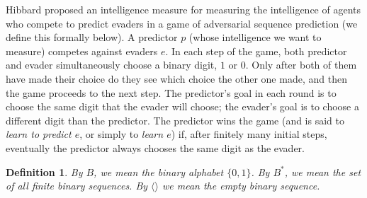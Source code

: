 \documentclass{article}
\newtheorem{definition}[theorem]{Definition}
\begin{document}
Hibbard proposed an intelligence measure for measuring the intelligence
of agents who compete to predict evaders in a game of
adversarial sequence prediction (we define this
formally below). A predictor $p$ (whose intelligence we want to measure)
competes against evaders $e$. In each step of the game,
both predictor and evader simultaneously choose a binary digit, $1$ or $0$.
Only after both of them have made their choice do they see which choice the other
one made, and then the game proceeds to the next step. The predictor's goal in
each round is to choose the same digit that the evader will choose;
the evader's goal is to choose a different digit than the predictor. The predictor
wins the game (and is said to \emph{learn to predict $e$}, or simply to
\emph{learn $e$}) if, after finitely many
initial steps, eventually the predictor always chooses the same digit as the
evader.

\begin{definition}
By $B$, we mean the binary alphabet $\{0,1\}$. By $B^*$, we mean the set of all
finite binary sequences. By $\langle\rangle$ we mean the empty binary sequence.
\end{definition}
\end{document}
